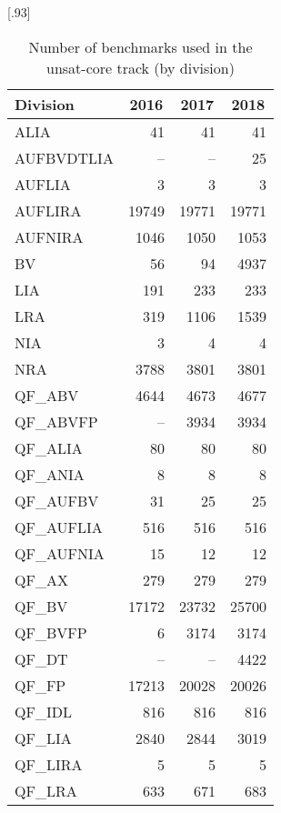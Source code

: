 \documentclass[twoside,11pt]{article}
\begin{document}
\begin{table}
  \caption{Number of benchmarks used in the unsat-core track (by
    division)}
  \label{table:benchmarks-unsat-core-track}
  \centering
  \scalebox{1}[.93]{\begin{tabular}{|l|r|r|r|}
    \hline
    Division & \multicolumn{1}{c|}{2016} & \multicolumn{1}{c|}{2017} & \multicolumn{1}{c|}{2018} \\
    \hline
    ALIA       &     41 &     41 &     41 \\
    AUFBVDTLIA &     -- &     -- &     25 \\
    AUFLIA     &      3 &      3 &      3 \\
    AUFLIRA    &  19749 &  19771 &  19771 \\
    AUFNIRA    &   1046 &   1050 &   1053 \\
    BV         &     56 &     94 &   4937 \\
    LIA        &    191 &    233 &    233 \\
    LRA        &    319 &   1106 &   1539 \\
    NIA        &      3 &      4 &      4 \\
    NRA        &   3788 &   3801 &   3801 \\
    QF\_ABV    &   4644 &   4673 &   4677 \\
    QF\_ABVFP  &     -- &   3934 &   3934 \\
    QF\_ALIA   &     80 &     80 &     80 \\
    QF\_ANIA   &      8 &      8 &      8 \\
    QF\_AUFBV  &     31 &     25 &     25 \\
    QF\_AUFLIA &    516 &    516 &    516 \\
    QF\_AUFNIA &     15 &     12 &     12 \\
    QF\_AX     &    279 &    279 &    279 \\
    QF\_BV     &  17172 &  23732 &  25700 \\
    QF\_BVFP   &      6 &   3174 &   3174 \\
    QF\_DT     &     -- &     -- &   4422 \\
    QF\_FP     &  17213 &  20028 &  20026 \\
    QF\_IDL    &    816 &    816 &    816 \\
    QF\_LIA    &   2840 &   2844 &   3019 \\
    QF\_LIRA   &      5 &      5 &      5 \\
    QF\_LRA    &    633 &    671 &    683 \\

\end{tabular}}
\end{table}
\end{document}
